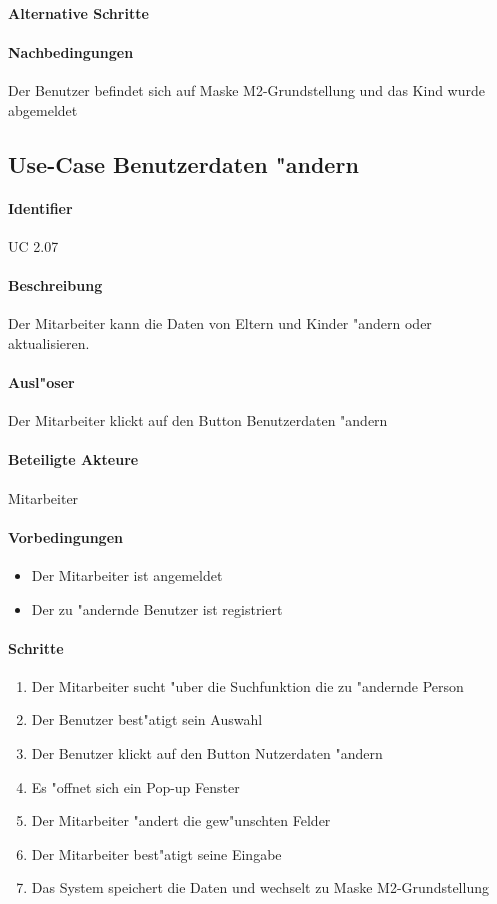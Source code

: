   \paragraph{Alternative Schritte}
  \paragraph{Nachbedingungen}
  Der Benutzer befindet sich auf Maske M2-Grundstellung und das Kind wurde abgemeldet

  
  \newpage
 \subsection{Use-Case Benutzerdaten "andern}
  \paragraph{Identifier}
  UC 2.07
  \paragraph{Beschreibung}
  Der Mitarbeiter kann die Daten von Eltern und Kinder "andern oder aktualisieren.
  \paragraph{Ausl"oser}
  Der Mitarbeiter klickt auf den Button \dq Benutzerdaten "andern\dq
  \paragraph{Beteiligte Akteure}   \leavevmode \newline
    Mitarbeiter
  \paragraph{Vorbedingungen}
  \begin{itemize}
   \item Der Mitarbeiter ist angemeldet
   \item Der zu "andernde Benutzer ist registriert
  \end{itemize}

  \paragraph{Schritte}
  \begin{enumerate}
   \item Der Mitarbeiter sucht "uber die Suchfunktion die zu "andernde Person
   \item Der Benutzer best"atigt sein Auswahl
   \item Der Benutzer klickt auf den Button \dq Nutzerdaten "andern\dq
   \item Es "offnet sich ein Pop-up Fenster
   \item Der Mitarbeiter "andert die gew"unschten Felder
   \item Der Mitarbeiter best"atigt seine Eingabe
   \item Das System speichert die Daten und wechselt zu Maske M2-Grundstellung
  \end{enumerate}

